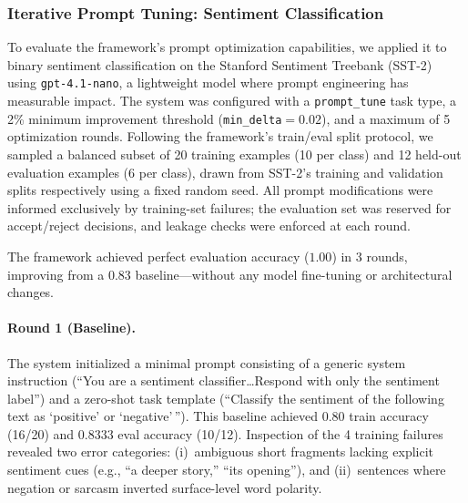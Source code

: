 \subsubsection{Iterative Prompt Tuning: Sentiment Classification}
\label{sec:experiment-sentiment}

To evaluate the framework's prompt optimization capabilities, we applied it to binary sentiment classification on the Stanford Sentiment Treebank (SST-2)~\cite{socher2013recursive} using \texttt{gpt-4.1-nano}, a lightweight model where prompt engineering has measurable impact. The system was configured with a \texttt{prompt\_tune} task type, a 2\% minimum improvement threshold (\texttt{min\_delta}${}= 0.02$), and a maximum of 5 optimization rounds. Following the framework's train/eval split protocol, we sampled a balanced subset of 20 training examples (10 per class) and 12 held-out evaluation examples (6 per class), drawn from SST-2's training and validation splits respectively using a fixed random seed. All prompt modifications were informed exclusively by training-set failures; the evaluation set was reserved for accept/reject decisions, and leakage checks were enforced at each round.

The framework achieved perfect evaluation accuracy ($1.00$) in 3 rounds, improving from a $0.83$ baseline---without any model fine-tuning or architectural changes.

\paragraph{Round 1 (Baseline).}
The system initialized a minimal prompt consisting of a generic system instruction (``You are a sentiment classifier\ldots Respond with only the sentiment label'') and a zero-shot task template (``Classify the sentiment of the following text as `positive' or `negative'\,'').  This baseline achieved $0.80$ train accuracy (16/20) and $0.8333$ eval accuracy (10/12). Inspection of the 4 training failures revealed two error categories: (i)~ambiguous short fragments lacking explicit sentiment cues (e.g., ``a deeper story,'' ``its opening''), and (ii)~sentences where negation or sarcasm inverted surface-level word polarity.

